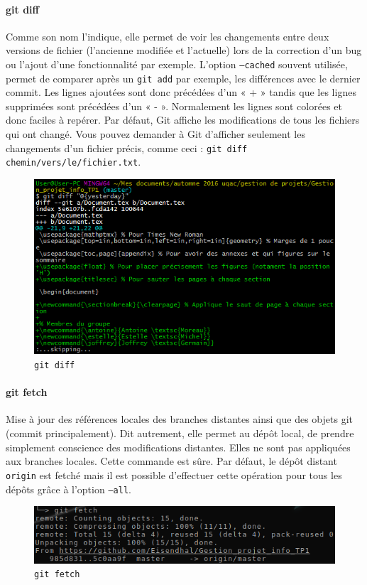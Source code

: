 \documentclass[11pt,canadien]{article}
\begin{document}
\paragraph{git diff}Comme son nom l’indique, elle permet de voir les changements entre deux versions de fichier (l’ancienne modifiée et l’actuelle) lors de la correction d’un bug ou l’ajout d’une fonctionnalité par exemple. L'option \texttt{--cached} souvent utilisée, permet de comparer après un \texttt{git add} par exemple, les différences avec le dernier commit. Les lignes ajoutées sont donc précédées d’un « + » tandis que les lignes supprimées sont précédées d’un « - ». Normalement les lignes sont colorées et donc faciles à repérer. Par défaut, Git affiche les modifications de tous les fichiers qui ont changé. Vous pouvez demander à Git d’afficher seulement les changements d’un fichier précis, comme ceci : \texttt{git diff chemin/vers/le/fichier.txt}.
\begin{figure}[h]
	\centering
	\includegraphics{images/git_diff.png}
	\caption{\texttt{git diff}}
	\label{fig:git_diff}
\end{figure}

\paragraph{git fetch}Mise à jour des références locales des branches distantes ainsi que des objets git (commit principalement). Dit autrement, elle permet au dépôt local, de prendre simplement conscience des modifications distantes. Elles ne sont pas appliquées aux branches locales. Cette commande est sûre. Par défaut, le dépôt distant \texttt{origin} est fetché mais il est possible d'effectuer cette opération pour tous les dépôts grâce à l'option \texttt{--all}.
\begin{figure}[h]
	\centering
	\includegraphics{images/git_fetch.png}
	\caption{\texttt{git fetch}}
	\label{fig:git_fetch}
\end{figure}
\end{document}
